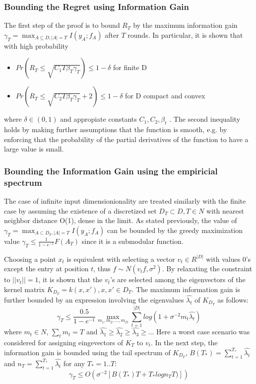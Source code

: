 \documentclass[10pt,journal,a4paper]{IEEEtran}
\begin{document}
\subsubsection{Bounding the Regret using Information Gain}
The first step of the proof is to bound $R_T$ by the maximum information gain $\gamma_T = \max_{A \subseteq D, |A| = T} I(y_A;f_A)$ after $T$ rounds.
In particular, it is shown that with high probability
\begin{itemize}
\item $Pr(R_T \leq \sqrt{C_1T\beta_T\gamma_T}) \leq 1- \delta$ for finite D
\item$Pr(R_T \leq \sqrt{C_2T\beta_T\gamma_T} + 2) \leq 1- \delta$ for  D compact and convex 
\end{itemize}
where $\delta \in (0,1)$ and appropiate constants $C_1, C_2, \beta_t$ . The second inequality holds by making further assumptions that the function is smooth, e.g. by enforcing that the probability of the partial derivatives of the function to have a large value is small.

\subsubsection{Bounding the Information Gain using the empiricial spectrum}
The case of  infinite input dimensionionality are treated similarly with the finite case by assuming the existence of a discretized set $D_T \subset D, T \in N $ with nearest neighbor distance O(1), dense in the limit. As stated previously, the value of $\gamma_T= \max_{A\subset D_T, |A|=T} I(y_A; f_A)$ can be bounded by the greedy maximization value $ \gamma_T \leq \frac{1}{1-e^{-1}} F(A_T)$ since it is a submodular function. 

Choosing a point $x_t$ is equivalent with selecting a vector $v_t\in R^{|D|}$ with values 0's except the entry at position $t$, thus $f\sim N(v_tf,\sigma^2)$. By relaxating the constraint to $||v_t|| = 1$, it is shown that the $v_t$'s are selected among the eigenvectors of the kernel matrix $K_{D_T} = k(x,x'),  x,x' \in D_T$. The maximum information gain is further bounded by an expression involving the eigenvalues $\hat{\lambda_t}$ of $K_{D_T}$ as follows:		
\begin{equation}		
	\gamma_T \leq \frac{0.5}{1-e^{-1}} \max_{m_1,m_2,...,m_D} \sum_{t=1}^{|D|} log(1 + \sigma^{-2}m_t \hat{\lambda_t})		
\end{equation}		
where $m_t\in N$, $\sum_t m_t = T$ and $\hat{\lambda_1} \geq \hat{\lambda_2} \geq \hat{\lambda_3} \geq ..$. Here a worst case scenario was considered for assigning eingevectors of $K_T$ to $v_t$.			
In the next step, the information gain is bounded using the tail spectrum of $K_{D_T}$, $B(T_{*}) = \sum_{t=1}^{T_*}\hat{\lambda_t}$ and $n_T = \sum_{t=1}^{T_*} \hat{\lambda_t}$ for any $T_{*}=1..T$:		
\begin{equation}		
\gamma_{T} \leq O(\sigma^{-2}[B(T_{*})T + T_{*}logn_T T)])		
\end{equation}		
		
\end{document}
